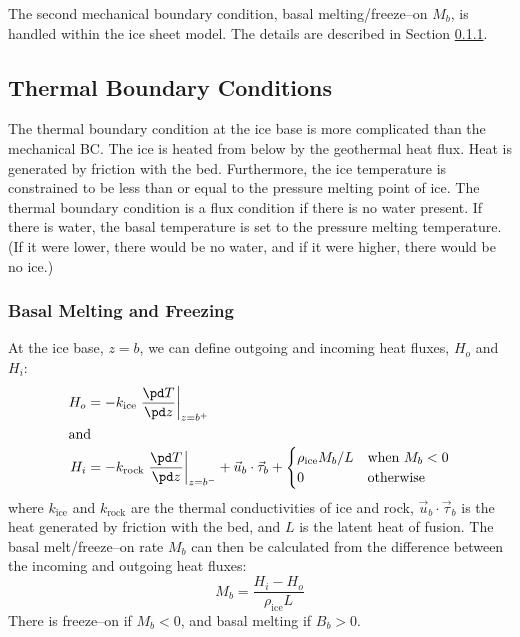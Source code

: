 The second mechanical boundary condition, basal melting/freeze--on $M_b$, is handled within the ice sheet model. The details are described in Section \ref{num.sec.bc_melt}.

\subsection{Thermal Boundary Conditions}
The thermal boundary condition at the ice base is more complicated than the mechanical BC. The ice is heated from below by the geothermal heat flux. Heat is generated by friction with the bed. Furthermore, the ice temperature is constrained to be less than or equal to the pressure melting point of ice. The thermal boundary condition is a flux condition if there is no water present. If there is water, the basal temperature is set to the pressure melting temperature. (If it were lower, there would be no water, and if it were higher, there would be no ice.)

\subsubsection{Basal Melting and Freezing}\label{num.sec.bc_melt}
At the ice base, $z=b$, we can define outgoing and incoming heat fluxes, $H_o$ and $H_i$:
\begin{subequations}
  \begin{align}
    H_o&=-k_{\text{ice}}\left.\frac{\pd T}{\pd z}\right|_{z=b^+}\\
    \intertext{and}
    H_i&=-k_{\text{rock}}\left.\frac{\pd T}{\pd z}\right|_{z=b^-}+\vec{u}_b\cdot\vec{\tau}_b+
    \begin{cases}
      {\rho_{\text{ice}}M_b}/{L} & \text{when $M_b<0$} \\
      0 & \text{otherwise}
    \end{cases}
  \end{align}
\end{subequations}
where $k_{\text{ice}}$ and $k_{\text{rock}}$ are the thermal conductivities of ice and rock, $\vec{u}_b\cdot\vec{\tau}_b$ is the heat generated by friction with the bed, and $L$ is the latent heat of fusion. The basal melt/freeze--on rate $M_b$ can then be calculated from the difference between the incoming and outgoing heat fluxes:
\begin{equation}
  \label{bc.eq.meltrate}
  M_b=\frac{H_i-H_o}{\rho_{\text{ice}}L}
\end{equation}
There is freeze--on if $M_b < 0$, and basal melting if $B_b > 0$.

